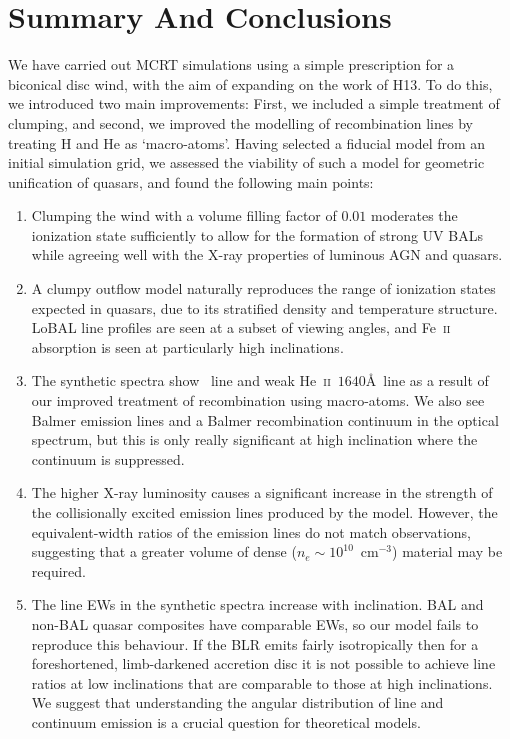 \documentclass[useAMS,usenatbib]{mn2e_x}
\begin{document}
\section{Summary And Conclusions}

We have carried out MCRT simulations using a simple
prescription for a biconical disc wind, with
the aim of expanding on the work of H13. To do this, we introduced two main
improvements: First, we included a simple treatment of clumping, and second, 
we improved the modelling of recombination lines by treating H and He as
`macro-atoms'. Having selected a fiducial model from an initial simulation grid,
we assessed the viability of such a model for geometric 
unification of quasars, and found the following main points:
\begin{enumerate}
\item Clumping the wind with a volume filling factor of $0.01$ 
moderates the ionization state
sufficiently to allow for the 
formation of strong UV BALs while agreeing well with the X-ray
properties of luminous AGN and quasars. 
\smallskip
\item A clumpy outflow model naturally 
reproduces the range of ionization states
expected in quasars, due to its stratified density
and temperature structure. 
LoBAL line profiles are seen at a subset of viewing angles, and Fe~\textsc{ii}
absorption is seen at particularly high inclinations. 
\smallskip
\item The synthetic spectra show \la\ line and weak He~\textsc{ii}~$1640$\AA\ line
as a result of our improved treatment of recombination using macro-atoms. We also see
Balmer emission lines and a Balmer recombination continuum in the optical spectrum, but this
is only really significant at high inclination where the continuum is suppressed.  
\smallskip
\item The higher X-ray luminosity causes a significant 
increase in the strength of the collisionally excited emission
lines produced by the model. 
However, the equivalent-width ratios of the emission lines do not match
observations, suggesting that a greater volume of dense ($n_e\sim10^{10}$~cm$^{-3}$)
material may be required.
\smallskip
\item The line EWs in the synthetic spectra increase with inclination.
BAL and non-BAL quasar composites have comparable EWs, so our model
fails to reproduce this behaviour.
 If the BLR emits fairly isotropically then for a 
foreshortened, limb-darkened accretion disc 
it is not possible to achieve line ratios at low inclinations 
that are comparable to those at high inclinations. 
We suggest that understanding the angular distribution of 
line and continuum emission is a crucial question for theoretical models.
\end{enumerate}
\end{document}
